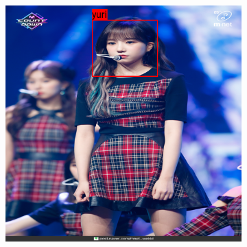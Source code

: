 \begin{figure}[htbp]
\begin{subfigure}[b]{0.32\textwidth}
    \end{subfigure}
    \hfill
    \begin{subfigure}[b]{0.32\textwidth}
        \centering
        \includegraphics[width=\textwidth]{images/introduction/yuri-correct.png}
    \end{subfigure}
    \hfill


\end{figure}
